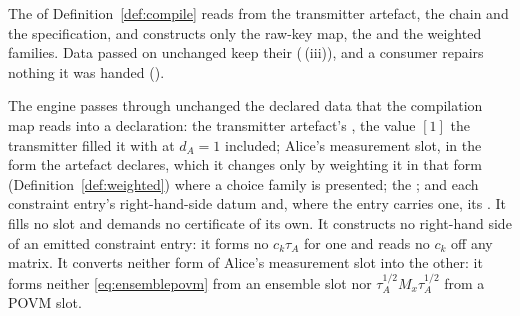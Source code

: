 
The  of Definition~\ref{def:compile} reads
 from the transmitter artefact, the chain and the
specification, and constructs only the raw-key map, the  and
the weighted families. Data passed on unchanged keep their 
(\,(iii)), and a consumer repairs nothing
it was handed ().

\begin{requirement}\label{req:pass-through}
The engine passes through unchanged the declared data that the compilation map
reads into a declaration: the transmitter artefact's , the
value $[1]$ the transmitter filled it with at $d_A=1$ included; Alice's
measurement slot, in the form the artefact declares, which it changes only by
weighting it in that form (Definition~\ref{def:weighted}) where a choice
family is presented; the ; and each
constraint entry's right-hand-side datum and, where the entry carries one, its
. It fills no slot and demands no certificate of its own.
It constructs no right-hand side of an emitted constraint entry: it forms no
$c_k\tau_A$ for one and reads no $c_k$ off any matrix. It converts neither
form of Alice's measurement slot into the other: it forms neither
\eqref{eq:ensemblepovm} from an ensemble slot nor
$\tau_A^{1/2}M_x\tau_A^{1/2}$ from a POVM slot.
\end{requirement}
